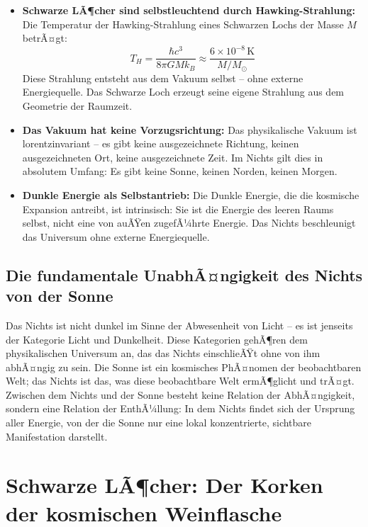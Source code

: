 ﻿\documentclass[12pt,a4paper]{report}
\begin{document}
\begin{itemize}
	\item \textbf{Schwarze LÃ¶cher sind selbstleuchtend durch Hawking-Strahlung:} Die Temperatur der Hawking-Strahlung eines Schwarzen Lochs der Masse $M$ betrÃ¤gt:
	\begin{equation}
		T_H = \frac{\hbar c^3}{8\pi G M k_B} \approx \frac{6 \times 10^{-8}\,\text{K}}{M/M_\odot}
		\label{eq:hawking_temp}
	\end{equation}
	Diese Strahlung entsteht aus dem Vakuum selbst -- ohne externe Energiequelle. Das Schwarze Loch erzeugt seine eigene Strahlung aus dem Geometrie der Raumzeit.

	\item \textbf{Das Vakuum hat keine Vorzugsrichtung:} Das physikalische Vakuum ist lorentzinvariant -- es gibt keine ausgezeichnete Richtung, keinen ausgezeichneten Ort, keine ausgezeichnete Zeit. Im Nichts gilt dies in absolutem Umfang: Es gibt keine Sonne, keinen Norden, keinen Morgen.

	\item \textbf{Dunkle Energie als Selbstantrieb:} Die Dunkle Energie, die die kosmische Expansion antreibt, ist intrinsisch: Sie ist die Energie des leeren Raums selbst, nicht eine von auÃŸen zugefÃ¼hrte Energie. Das Nichts beschleunigt das Universum ohne externe Energiequelle.
\end{itemize}

\subsection{Die fundamentale UnabhÃ¤ngigkeit des Nichts von der Sonne}

Das Nichts ist nicht dunkel im Sinne der Abwesenheit von Licht -- es ist jenseits der Kategorie \glqq Licht\grqq{} und \glqq Dunkelheit\grqq{}. Diese Kategorien gehÃ¶ren dem physikalischen Universum an, das das Nichts einschlieÃŸt ohne von ihm abhÃ¤ngig zu sein. Die Sonne ist ein kosmisches PhÃ¤nomen der beobachtbaren Welt; das Nichts ist das, was diese beobachtbare Welt ermÃ¶glicht und trÃ¤gt. Zwischen dem Nichts und der Sonne besteht keine Relation der AbhÃ¤ngigkeit, sondern eine Relation der EnthÃ¼llung: In dem Nichts findet sich der Ursprung aller Energie, von der die Sonne nur eine lokal konzentrierte, sichtbare Manifestation darstellt.

\section{Schwarze LÃ¶cher: Der Korken der kosmischen Weinflasche}
\end{document}

